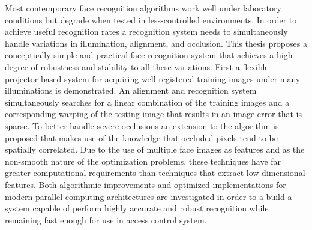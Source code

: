 Most contemporary face recognition algorithms work well under laboratory
conditions but degrade when tested in less-controlled environments. In order to
achieve useful recognition rates a recognition system needs to simultaneously
handle variations in illumination, alignment, and occlusion. This thesis
proposes a conceptually simple and practical face recognition system that
achieves a high degree of robustness and stability to all these variations.
First a flexible projector-based system for acquiring well registered training
images under many illuminations is demonstrated.  An alignment and recognition
system simultaneously searches for a linear combination of the training images
and a corresponding warping of the testing image that results in an image error
that is sparse.  To better handle severe occlusions an extension to the
algorithm is proposed that makes use of the knowledge that occluded pixels tend
to be spatially correlated.  Due to the use of multiple face images as features
and as the non-smooth nature of the optimization problems, these techniques
have far greater computational requirements than techniques that extract
low-dimensional features.  Both algorithmic improvements and optimized
implementations for modern parallel computing architectures are investigated in
order to a build a system capable of perform highly accurate and robust
recognition while remaining fast enough for use in access control system.  


